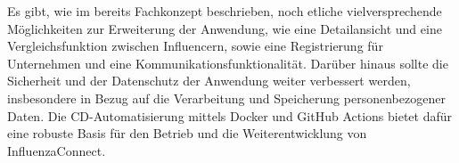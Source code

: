 \documentclass[conference,a4paper,flushend]{cs-techrep}
\begin{document}
Es gibt, wie im bereits Fachkonzept beschrieben, noch etliche vielversprechende Möglichkeiten zur Erweiterung der Anwendung, wie eine Detailansicht und eine Vergleichsfunktion zwischen Influencern, sowie eine Registrierung für Unternehmen und eine Kommunikationsfunktionalität. Darüber hinaus sollte die Sicherheit und der Datenschutz der Anwendung weiter verbessert werden, insbesondere in Bezug auf die Verarbeitung und Speicherung personenbezogener Daten. Die CD-Automatisierung mittels Docker \cite{docker} und GitHub Actions \cite{GitHubActions} bietet dafür eine robuste Basis für den Betrieb und die Weiterentwicklung von InfluenzaConnect. 








\sloppy
\printbibliography[notcategory=selfref]
\end{document}
